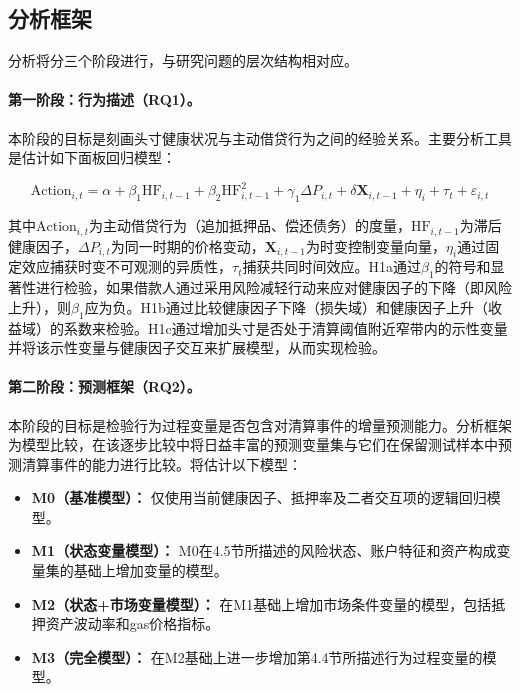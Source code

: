 \subsection{分析框架}

分析将分三个阶段进行，与研究问题的层次结构相对应。


\vspace{4pt}

\paragraph{第一阶段：行为描述（RQ1）。} 本阶段的目标是刻画头寸健康状况与主动借贷行为之间的经验关系。主要分析工具是估计如下面板回归模型：

\begin{equation}
\text{Action}_{i,t} = \alpha + \beta_1 \text{HF}_{i,t-1} + \beta_2 \text{HF}_{i,t-1}^2 + \gamma_1 \Delta P_{i,t} + \delta \mathbf{X}_{i,t-1} + \eta_i + \tau_t + \varepsilon_{i,t}
\end{equation}

其中\(\text{Action}_{i,t}\)为主动借贷行为（追加抵押品、偿还债务）的度量，\(\text{HF}_{i,t-1}\)为滞后健康因子，\(\Delta P_{i,t}\)为同一时期的价格变动，\(\mathbf{X}_{i,t-1}\)为时变控制变量向量，\(\eta_i\)通过固定效应捕获时变不可观测的异质性，\(\tau_t\)捕获共同时间效应。H1a通过\(\beta_1\)的符号和显著性进行检验，如果借款人通过采用风险减轻行动来应对健康因子的下降（即风险上升），则\(\beta_1\)应为负。H1b通过比较健康因子下降（损失域）和健康因子上升（收益域）的系数来检验。H1c通过增加头寸是否处于清算阈值附近窄带内的示性变量并将该示性变量与健康因子交互来扩展模型，从而实现检验。

\paragraph{第二阶段：预测框架（RQ2）。} 本阶段的目标是检验行为过程变量是否包含对清算事件的增量预测能力。分析框架为模型比较，在该逐步比较中将日益丰富的预测变量集与它们在保留测试样本中预测清算事件的能力进行比较。将估计以下模型：

\begin{itemize}[leftmargin=*,labelindent=\parindent, itemindent=0pt]
\item \textbf{M0（基准模型）：} 仅使用当前健康因子、抵押率及二者交互项的逻辑回归模型。
\item \textbf{M1（状态变量模型）：} M0在4.5节所描述的风险状态、账户特征和资产构成变量集的基础上增加变量的模型。
\item \textbf{M2（状态+市场变量模型）：} 在M1基础上增加市场条件变量的模型，包括抵押资产波动率和gas价格指标。
\item \textbf{M3（完全模型）：} 在M2基础上进一步增加第4.4节所描述行为过程变量的模型。
\end{itemize}

